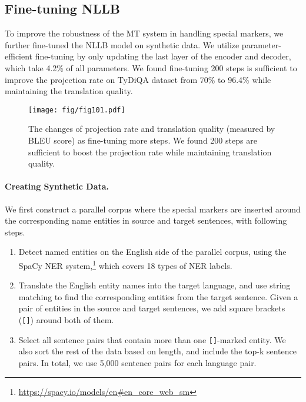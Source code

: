 \documentclass[11pt,dvipsnames]{article}
\begin{document}
\subsection{Fine-tuning NLLB}
To  improve the robustness of the MT system in handling special markers, we further fine-tuned the NLLB  model on synthetic data. We utilize parameter-efficient fine-tuning by only updating the last layer of the encoder and decoder, which take 4.2\% of all parameters. We found fine-tuning 200 steps is sufficient to improve the projection rate on  TyDiQA dataset from  70\% to 96.4\% while maintaining the  translation quality. 


\label{sec:fine-tune-nllb}


\begin{figure}[t!]
    \centering
    \vspace{-3pt}
    \texttt{[image: fig/fig101.pdf]}
    \vspace{-25pt}
    \caption{The changes of   projection rate and translation quality (measured by BLEU score)  as fine-tuning more steps. We found  200 steps are sufficient to boost the projection rate while maintaining  translation quality.}
    \label{fig:projection-rate-translation-quality-change}
    \vspace{-15pt}
\end{figure}


\paragraph{Creating Synthetic Data.}
We first construct a parallel corpus where the special markers are inserted around the  corresponding name entities  in  source and target sentences, with  following  steps.  

\begin{enumerate}[topsep=2pt,itemsep=0pt,partopsep=2pt,parsep=1pt]
\item Detect named entities on the English side of the parallel corpus, using the SpaCy NER system,\footnote{\url{https://spacy.io/models/en\#en_core_web_sm}} which covers 18 types of NER labels. 
\item Translate  the English entity names into the target language, and use string matching to find the corresponding entities from the target sentence. Given a pair of entities in the source and target sentences, we add square brackets (\texttt{[]}) around both of them.
\item Select all sentence pairs that contain more than one \texttt{[]}-marked entity. We also sort the rest of the data based on  length, and include the top-k sentence pairs. In total, we use 5,000 sentence pairs for each language pair.
\end{enumerate}
\end{document}
